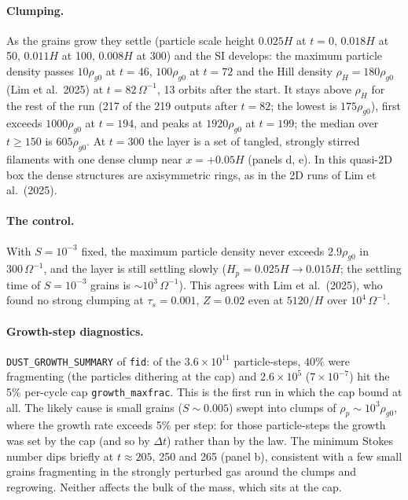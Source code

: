\documentclass[11pt]{article}
\newcommand{\code}[1]{\texttt{#1}}
\newcommand{\St}{S}
\begin{document}
\paragraph{Clumping.} As the grains grow they settle (particle scale height $0.025H$ at
$t=0$, $0.018H$ at 50, $0.011H$ at 100, $0.008H$ at 300) and the SI develops: the
maximum particle density passes $10\rho_{g0}$ at $t=46$, $100\rho_{g0}$ at $t=72$ and the
Hill density $\rho_H=180\rho_{g0}$ (Lim et al.\ 2025) at $t=82\,\Omega^{-1}$, 13 orbits
after the start. It stays above $\rho_H$ for the rest of the run (217 of the 219 outputs
after $t=82$; the lowest is $175\rho_{g0}$), first exceeds $1000\rho_{g0}$ at $t=194$, and
peaks at $1920\rho_{g0}$ at $t=199$; the median over $t\ge150$ is $605\rho_{g0}$. At
$t=300$ the layer is a set of tangled, strongly stirred filaments with one dense clump
near $x=+0.05H$ (panels d, e). In this quasi-2D box the dense structures are
axisymmetric rings, as in the 2D runs of Lim et al.\ (2025).

\paragraph{The control.} With $\St=10^{-3}$ fixed, the maximum particle density never
exceeds $2.9\rho_{g0}$ in $300\,\Omega^{-1}$, and the layer is still settling slowly
($H_p=0.025H\to0.015H$; the settling time of $\St=10^{-3}$ grains is
$\sim\!10^3\,\Omega^{-1}$). This agrees with Lim et al.\ (2025), who found no strong
clumping at $\tau_s=0.001$, $Z=0.02$ even at $5120/H$ over $10^4\,\Omega^{-1}$.

\paragraph{Growth-step diagnostics.} \code{DUST\_GROWTH\_SUMMARY} of \code{fid}: of the
$3.6\times10^{11}$ particle-steps, $40\%$ were fragmenting (the particles dithering at
the cap) and $2.6\times10^5$ ($7\times10^{-7}$) hit the 5\% per-cycle cap
\code{growth\_maxfrac}. This is the first run in which the cap bound at all. The likely
cause is small grains ($\St\sim0.005$) swept into clumps of $\rho_p\sim10^3\rho_{g0}$,
where the growth rate exceeds 5\% per step: for those particle-steps the growth was set
by the cap (and so by $\Delta t$) rather than by the law. The minimum Stokes number dips
briefly at $t\approx205$, 250 and 265 (panel b), consistent with a few small grains
fragmenting in the strongly perturbed gas around the clumps and regrowing. Neither
affects the bulk of the mass, which sits at the cap.
\end{document}
